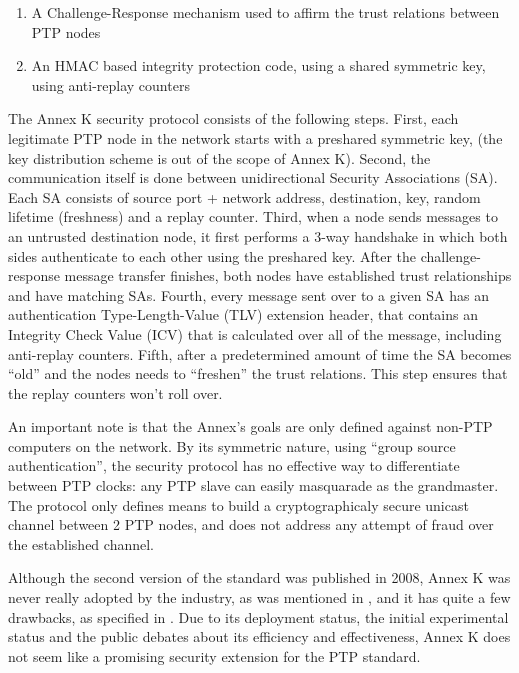 \documentclass[11pt]{article}
\begin{document}
\begin{enumerate}

  \item A Challenge-Response mechanism used to affirm the trust relations between PTP nodes

  \item An HMAC \cite{HMAC} based integrity protection code, using a shared symmetric key, using anti-replay counters

\end{enumerate}



The Annex K security protocol consists of the following steps. First, each legitimate PTP node in the network starts with a preshared symmetric key, (the key distribution scheme is out of the scope of Annex K). Second, the communication itself is done between unidirectional Security Associations (SA). Each SA consists of source port + network address, destination, key, random lifetime (freshness) and a replay counter. Third, when a node sends messages to an untrusted destination node, it first performs a 3-way handshake in which both sides authenticate to each other using the preshared key. After the challenge-response message transfer finishes, both nodes have established trust relationships and have matching SAs. Fourth, every message sent over to a given SA has an authentication Type-Length-Value (TLV) extension header, that contains an Integrity Check Value (ICV) that is calculated over all of the message, including anti-replay counters. Fifth, after a predetermined amount of time the SA becomes ``old'' and the nodes needs to ``freshen'' the trust relations. This step ensures that the replay counters won't roll over.



An important note is that the Annex's goals are only defined against non-PTP computers on the network. By its symmetric nature, using ``group source authentication'', the security protocol has no effective way to differentiate between PTP clocks: any PTP slave can easily masquarade as the grandmaster. The protocol only defines means to build a cryptographicaly secure unicast channel between 2 PTP nodes, and does not address any attempt of fraud over the established channel.



Although the second version of the standard was published in 2008, Annex K was never really adopted by the industry, as was mentioned in \cite{first_deploy}, and it has quite a few drawbacks, as specified in \cite{state_of_the_art}. Due to its deployment status, the initial experimental status and the public debates about its efficiency and effectiveness, Annex K does not seem like a promising security extension for the PTP standard.
\end{document}
